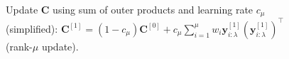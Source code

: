 \documentclass[11pt,compress,t,notes=noshow, xcolor=table]{beamer}
\begin{document}
\begin{frame}
\begin{figure}
\begin{overprint}
{Update $\bm{C}$ using sum of outer products and learning rate $c_{\mu}$ (simplified): $\bm{C}^{[1]} = (1-c_{\mu}) \bm{C}^{[0]} + c_{\mu} \sum_{i=1}^{\mu} w_i \bm{y}_{i:\lambda}^{[1]}(\bm{y}_{i:\lambda}^{[1]})^{\top}$ (rank-$\mu$ update).
}



\end{overprint}
\end{figure}
\end{frame}
\end{document}
